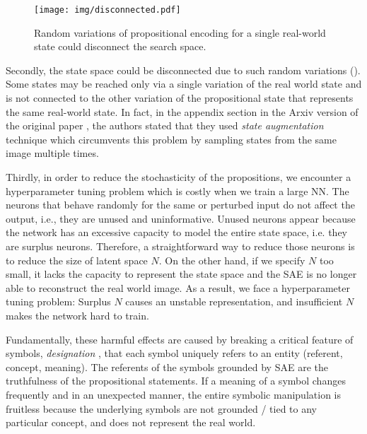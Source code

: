 \begin{figure}[tb]
 \centering
 \texttt{[image: img/disconnected.pdf]}
 \caption{Random variations of propositional encoding for a single real-world state could disconnect the search space.}
 \label{disconnected}
\end{figure}

Secondly, the state space could be disconnected due to such random variations ().
Some states may be reached only via a single variation of the real world state and is not connected to the
other variation of the propositional state that represents the same real-world state.
In fact, in the appendix section in the Arxiv version of the original paper \cite{Asai2018},
the authors stated that they used \emph{state augmentation} technique
which circumvents this problem by sampling states from the same image multiple times.

Thirdly, in order to reduce the stochasticity of the propositions, we encounter a hyperparameter tuning problem
which is costly when we train a large NN.
% 
The neurons that behave randomly for the same or perturbed input do not affect the output,
i.e., they are unused and uninformative.
Unused neurons appear because the network has an excessive capacity to 
model the entire state space, i.e. they are surplus neurons.
Therefore, a straightforward way to reduce those neurons is to reduce the size of latent space $N$.
On the other hand, if we specify $N$ too small, it lacks the capacity to represent the state space
and the SAE is no longer able to reconstruct the real world image.
As a result, we face a hyperparameter tuning problem: Surplus $N$ causes an unstable representation,
and insufficient $N$ makes the network hard to train.


Fundamentally,
these harmful effects are caused by breaking a critical feature of symbols, \emph{designation} \cite{newell1976computer,newell1980physical},
that each symbol uniquely refers to an entity (referent, concept, meaning).
The referents of the symbols grounded by SAE are the truthfulness of the propositional statements.
If a meaning of a symbol changes frequently and in an unexpected manner, the entire symbolic manipulation is fruitless
because the underlying symbols are not grounded / tied to any particular concept, and does not represent the real world.


